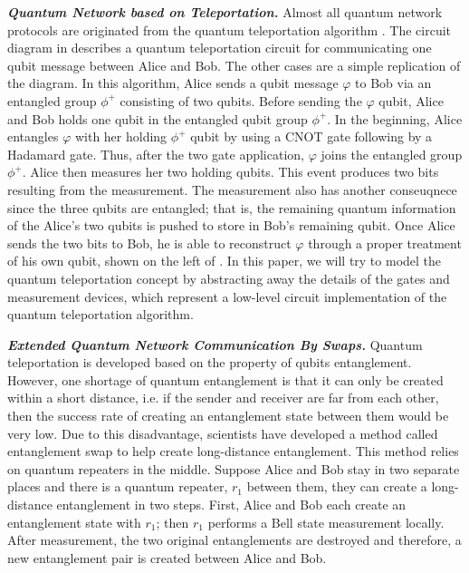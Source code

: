 \noindent\textbf{\textit{Quantum Network based on Teleportation.}}
Almost all quantum network protocols are originated from the quantum teleportation algorithm \cite{PhysRevLett.70.1895}.
The circuit diagram in  describes a quantum teleportation circuit for communicating one qubit message between Alice and Bob. The other cases are a simple replication of the diagram.
In this algorithm, Alice sends a qubit message $\varphi$ to Bob via an entangled group $\phi^{+}$ consisting of two qubits.
Before sending the $\varphi$ qubit, Alice and Bob holds one qubit in the entangled qubit group $\phi^{+}$.
In the beginning, Alice entangles $\varphi$ with her holding $\phi^{+}$ qubit by using a CNOT gate following by a Hadamard gate.
Thus, after the two gate application, $\varphi$ joins the entangled group $\phi^{+}$.
Alice then measures her two holding qubits. This event produces two bits resulting from the measurement.
The measurement also has another conseuqnece since the three qubits are entangled;
that is, the remaining quantum information of the Alice's two qubits is pushed to store in Bob's remaining qubit.
Once Alice sends the two bits to Bob, he is able to reconstruct $\varphi$ through a proper treatment of his own qubit,
shown on the left of .
In this paper, we will try to model the quantum teleportation concept
by abstracting away the details of the gates and measurement devices,
which represent a low-level circuit implementation of the quantum teleportation algorithm.

\noindent\textbf{\textit{Extended Quantum Network Communication By Swaps.}}
Quantum teleportation is developed based on the property of qubits entanglement. However, one shortage of quantum entanglement is that it can only be created within a short distance, i.e. if the sender and receiver are far from each other, then the success rate of creating an entanglement state between them would be very low. Due to this disadvantage, scientists have developed a method called entanglement swap to help create long-distance entanglement. This method relies on quantum repeaters in the middle. Suppose Alice and Bob stay in two separate places and there is a quantum repeater, $r_1$ between them, they can create a long-distance entanglement in two steps. First, Alice and Bob each create an entanglement state with $r_1$; then $r_1$ performs a Bell state measurement locally. After measurement, the two original entanglements are destroyed and therefore, a new entanglement pair is created between Alice and Bob. 

